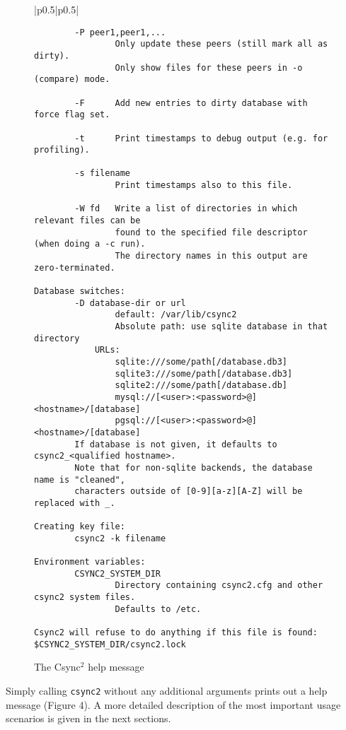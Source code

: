 \documentclass[a4paper,twocolumn]{article}
\def\csync2{{\sc Csync$^{2}$}}
\begin{document}
\begin{figure*}[t]
\begin{center}
\begin{tabular}{|p{0.5\linewidth}|p{0.5\linewidth}|}
\begin{tiny}
\begin{verbatim}
        -P peer1,peer1,...
                Only update these peers (still mark all as dirty).
                Only show files for these peers in -o (compare) mode.

        -F      Add new entries to dirty database with force flag set.

        -t      Print timestamps to debug output (e.g. for profiling).

        -s filename
                Print timestamps also to this file.

        -W fd   Write a list of directories in which relevant files can be
                found to the specified file descriptor (when doing a -c run).
                The directory names in this output are zero-terminated.

Database switches:
        -D database-dir or url
                default: /var/lib/csync2
                Absolute path: use sqlite database in that directory
            URLs:
                sqlite:///some/path[/database.db3]
                sqlite3:///some/path[/database.db3]
                sqlite2:///some/path[/database.db]
                mysql://[<user>:<password>@]<hostname>/[database]
                pgsql://[<user>:<password>@]<hostname>/[database]
        If database is not given, it defaults to csync2_<qualified hostname>.
        Note that for non-sqlite backends, the database name is "cleaned",
        characters outside of [0-9][a-z][A-Z] will be replaced with _.

Creating key file:
        csync2 -k filename

Environment variables:
        CSYNC2_SYSTEM_DIR
                Directory containing csync2.cfg and other csync2 system files.
                Defaults to /etc.

Csync2 will refuse to do anything if this file is found:
$CSYNC2_SYSTEM_DIR/csync2.lock
\end{verbatim}
\end{tiny}
      \tabularnewline
      \hline
    \end{tabular}
  \end{center}
  \caption{The \csync2 help message}
\end{figure*}


Simply calling {\tt csync2} without any additional arguments prints out a
help message (Figure 4). A more detailed description of the most
important usage scenarios is given in the next sections.
\end{document}
